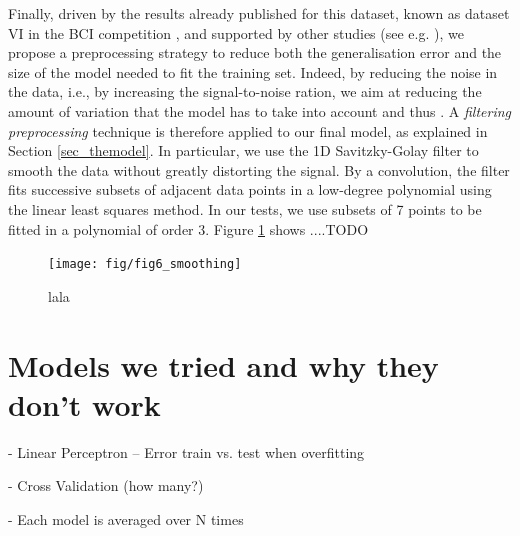 \documentclass{article}
\begin{document}
Finally, driven by the results already published for this dataset, known as dataset VI in the BCI competition \cite{bci_ii}, and supported by other studies (see e.g. \cite{schirrmeister2017deep}), we propose a preprocessing strategy to reduce both the generalisation error and the size of the model needed to fit the training set.
Indeed, by reducing the noise in the data, i.e., by increasing the signal-to-noise ration, we aim at reducing the amount of variation that the model has to take into account \cite{goodfellow2016deep} and thus . 
A \emph{filtering preprocessing} technique is therefore applied to our  final model, as explained in Section \ref{sec_themodel}.
In particular, we use the 1D Savitzky-Golay filter \cite{savgol} to smooth the data without greatly distorting the signal. 
By a convolution, the filter fits successive subsets of adjacent data points in a low-degree polynomial using the linear least squares method. 
In our tests, we use subsets of 7 points to be fitted in a polynomial of order 3.
Figure \ref{fig_smoothig_savgol} shows ....TODO
 \begin{figure}[h]
 \begin{center}
  \texttt{[image: fig/fig6\_smoothing]} 
  \caption{lala
  \label{fig_smoothig_savgol}}
  \end{center}
  \end{figure}

 

 
 \section{Models we tried and why they don't work}\label{sec_allmodel}
 
 - Linear Perceptron --  Error train vs. test when overfitting 
 
 - Cross Validation (how many?)
 
 - Each model is averaged over N times 
 
\end{document}
